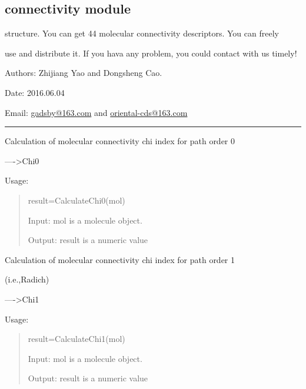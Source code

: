 \documentclass[letterpaper,10pt,english]{sphinxmanual}
\begin{document}
\subsection{connectivity module}
\label{reference/connectivity::doc}\label{reference/connectivity:connectivity-module}\label{reference/connectivity:module-connectivity}
structure. You can get 44 molecular connectivity descriptors. You can freely

use and distribute it. If you hava  any problem, you could contact with us timely!

Authors: Zhijiang Yao and Dongsheng Cao.

Date: 2016.06.04

Email: \href{mailto:gadsby@163.com}{gadsby@163.com} and \href{mailto:oriental-cds@163.com}{oriental-cds@163.com}


\bigskip\hrule{}\bigskip


\begin{fulllineitems}
\label{reference/connectivity:connectivity.CalculateChi0}
Calculation of molecular connectivity chi index for path order 0

----\textgreater{}Chi0

Usage:
\begin{quote}

result=CalculateChi0(mol)

Input: mol is a molecule object.

Output: result is a numeric value
\end{quote}

\end{fulllineitems}


\begin{fulllineitems}
\label{reference/connectivity:connectivity.CalculateChi1}
Calculation of molecular connectivity chi index for path order 1

(i.e.,Radich)

----\textgreater{}Chi1

Usage:
\begin{quote}

result=CalculateChi1(mol)

Input: mol is a molecule object.

Output: result is a numeric value
\end{quote}

\end{fulllineitems}
\end{document}
